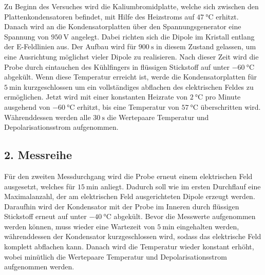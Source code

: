 Zu Beginn des Versuches wird die Kaliumbromidplatte, welche sich zwischen den 
Plattenkondensatoren befindet,
mit Hilfe des Heizstroms auf $\SI{47}{\celsius}$ erhitzt.
Danach wird an die Kondensatorplatten über den 
Spannungsgenerator eine Spannung von $\SI{950}{\volt}$ angelegt. 
Dabei richten sich die Dipole im Kristall entlang der E-Feldlinien aus.
Der Aufbau wird für $\SI{900}{\second}$ in diesem Zustand gelassen, um eine 
Ausrichtung möglichst vieler Dipole zu realisieren.
Nach dieser Zeit wird die Probe durch eintauchen des Kühlfingers in 
flüssigen Stickstoff auf unter $\SI{-60}{\celsius}$ abgekült.
Wenn diese Temperatur erreicht ist, werde die Kondensatorplatten für 
$\SI{5}{\minute}$ kurzgeschlossen
um ein vollständiges abflachen des elektrischen Feldes zu ermöglichen.
Jetzt wird mit einer konstanten Heizrate von $\SI{2}{\celsius}$ pro Minute 
ausgehend von 
$\SI{-60}{\celsius}$ erhitzt, bis eine Temperatur von $\SI{57}{\celsius}$ 
überschritten wird. 
Währenddessen werden alle $\SI{30}{\second}$ die Wertepaare Temperatur und 
Depolarisationsstrom aufgenommen.


\subsection{2. Messreihe}

Für den zweiten Messdurchgang wird die Probe erneut einem elektrischen Feld ausgesetzt,
welches für $\SI{15}{\minute}$ anliegt. Dadurch soll wie im ersten Durchflauf eine Maximalanzahl,
der am elektrischen Feld ausgerichteten Dipole erzeugt werden.
Daraufhin wird der Kondensator mit der Probe im Inneren durch flüssigen Stickstoff erneut auf 
unter $\SI{-40}{\celsius}$ abgekült. Bevor die Messwerte aufgenommen werden können, muss wieder 
eine Wartezeit von $\SI{5}{\minute}$ eingehalten werden, währenddessen der Kondensator 
kurzgeschlossen wird, sodass das elektrische Feld komplett abflachen kann.
Danach wird die Temperatur wieder konstant erhöht, wobei minütlich die Wertepaare
Temperatur und Depolarisationsstrom aufgenommen werden.

